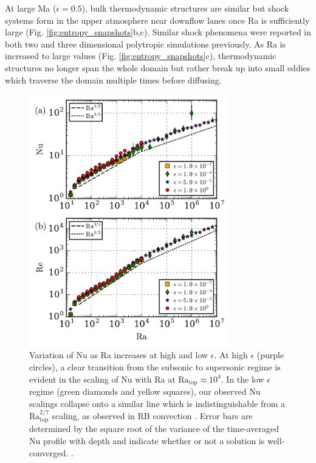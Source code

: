 \documentclass[aps, prl, twocolumn, nofootinbib, groupedaddress, amsfonts, amssymb, amsmath]{revtex4-1}
\begin{document}
At large Ma ($\epsilon = 0.5$), bulk thermodynamic structures are similar but
shock systems form in the upper atmosphere near downflow lanes 
once Ra is sufficiently large  (Fig. \ref{fig:entropy_snapshots}b,c).
Similar shock phenomena were reported in
both two \cite{cattaneo&all1990} and three \cite{malagoli&all1990} dimensional polytropic simulations previously.
As Ra is increased to large values 
(Fig. \ref{fig:entropy_snapshots}c), thermodynamic structures 
no longer span the whole domain but rather break up into 
small eddies which traverse the domain multiple
times before diffusing.  

\begin{figure}[t]
\includegraphics[width=3.4375in]{./figs/re_and_nu_v_Ra.png}
\caption{
Variation of Nu as Ra increases at high and low $\epsilon$. 
At high $\epsilon$ (purple circles), 
a clear transition from the subsonic to supersonic regime is evident in the scaling
of Nu with Ra at $\text{Ra}_{\text{top}} \approx 10^4$.  In the low $\epsilon$ regime (green diamonds and yellow squares), 
our observed Nu scalings collapse onto a similar line which is
indistinguishable from a $\text{Ra}_{\text{top}}^{2/7}$ scaling, 
as observed in RB convection \cite{johnston&doering2009}.  Error bars are determined
 by the square root of the variance of the time-averaged Nu profile with depth and 
 indicate whether or not a solution is well-converged.
 \label{fig:re_and_nu_v_ra}.
}
\end{figure}
\end{document}
